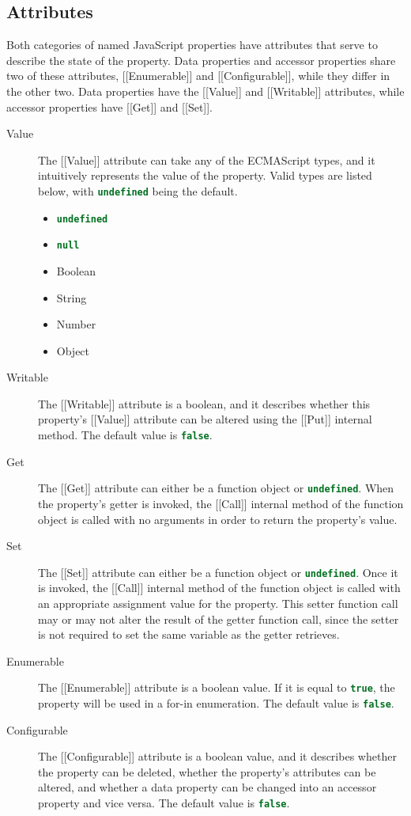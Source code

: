 \documentclass[a4paper,11pt,twoside]{report}
\def\jsinline{\lstinline[language=JavaScript, basicstyle=\small]}%\end{lstlisting}
\begin{document}
\subsection{Attributes}\label{sec:attributes}
Both categories of named JavaScript properties have attributes that serve to describe the state of the property. Data properties and accessor properties share two of these attributes, [[Enumerable]] and [[Configurable]], while they differ in the other two. Data properties have the [[Value]] and [[Writable]] attributes, while accessor properties have [[Get]] and [[Set]].

\begin{description}
\item[Value] The [[Value]] attribute can take any of the ECMAScript types, and it intuitively represents the value of the property. Valid types are listed below, with \jsinline|undefined| being the default.
\begin{multicols}{2}
\begin{itemize}
	\item \jsinline|undefined|
	\item \jsinline|null|
	\item Boolean
	\item String
	\item Number
	\item Object
\end{itemize}
\end{multicols}

\item[Writable] The [[Writable]] attribute is a boolean, and it describes whether this property's [[Value]] attribute can be altered using the [[Put]] internal method. The default value is \jsinline|false|. 

\item[Get] The [[Get]] attribute can either be a function object or \jsinline|undefined|. When the property's getter is invoked, the [[Call]] internal method of the function object is called with no arguments in order to return the property's value.

\item[Set] The [[Set]] attribute can either be a function object or \jsinline|undefined|. Once it is invoked, the [[Call]] internal method of the function object is called with an appropriate assignment value for the property. This setter function call may or may not alter the result of the getter function call, since the setter is not required to set the same variable as the getter retrieves. 

\item[Enumerable] The [[Enumerable]] attribute is a boolean value. If it is equal to \jsinline|true|, the property will be used in a for-in enumeration. The default value is \jsinline|false|.

\item[Configurable] The [[Configurable]] attribute is a boolean value, and it describes whether the property can be deleted, whether the property's attributes can be altered, and whether a data property can be changed into an accessor property and vice versa. The default value is \jsinline|false|.
\end{description}
\end{document}
